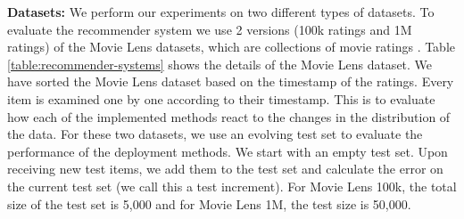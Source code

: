 \documentclass{vldb}
\begin{document}
\textbf{Datasets:} We perform our experiments on two different types of datasets.
To evaluate the recommender system we use 2 versions (100k ratings and 1M ratings) of the Movie Lens datasets, which are collections of movie ratings \cite{harper2016movielens}.
Table \ref{table:recommender-systems} shows the details of the Movie Lens dataset.
We have sorted the Movie Lens dataset based on the timestamp of the ratings.
Every item is examined one by one according to their timestamp.
This is to evaluate how each of the implemented methods react to the changes in the distribution of the data.
For these two datasets, we use an evolving test set to evaluate the performance of the deployment methods.
We start with an empty test set.
Upon receiving new test items, we add them to the test set and calculate the error on the current test set (we call this a test increment).
For Movie Lens 100k, the total size of the test set is 5,000 and for Movie Lens 1M, the test size is 50,000. 
\end{document}
